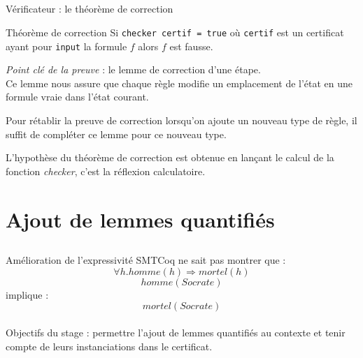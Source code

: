 \documentclass{beamer}
\begin{document}
\subsection{}
\begin{frame}{Vérificateur : le théorème de correction}

\begin{block}{ Théorème de correction}
Si \texttt{checker certif = true} où \texttt{certif} est un certificat ayant pour \texttt{input} la formule $f$ alors $f$ est fausse.
\end{block}

\textit{Point clé de la preuve} : le lemme de correction d'une étape.\\
Ce lemme nous assure que chaque règle modifie un emplacement de l'état en une formule vraie dans l'état courant.


\vspace{5mm}

Pour rétablir la preuve de correction lorsqu'on ajoute un nouveau type de règle, il suffit de compléter ce lemme pour ce nouveau type.
  
\vspace{5mm}

L'hypothèse du théorème de correction est obtenue en lançant le calcul de la fonction \textit{checker}, c'est la réflexion calculatoire.
  
  
\end{frame}





\section{Ajout de lemmes quantifiés}


\subsection{}
\begin{frame}{Amélioration de l'expressivité}
SMTCoq ne sait pas montrer que :
\[\forall h. homme(h) \Rightarrow mortel(h)\]
\[homme(Socrate)\]
implique :
\[mortel(Socrate)\]
\vspace*{2mm} \\
Objectifs du stage : permettre l'ajout de lemmes quantifiés au contexte et tenir compte de leurs instanciations dans le certificat.
\vspace*{6mm}\\
\end{frame}
\end{document}
